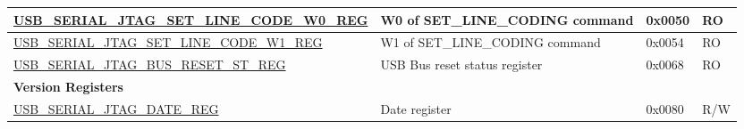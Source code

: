 \begin{longtable}{ | p{7.3cm} | p{5.7cm} | p{1.2cm} | p{1.5cm} | }
\hyperref[regdesc:USBSERIALJTAGSETLINECODEW0REG]{USB\_SERIAL\_JTAG\_SET\_LINE\_CODE\_W0\_REG} & W0 of SET\_LINE\_CODING command & 0x0050 & RO \\ \hline
\hyperref[regdesc:USBSERIALJTAGSETLINECODEW1REG]{USB\_SERIAL\_JTAG\_SET\_LINE\_CODE\_W1\_REG} & W1 of SET\_LINE\_CODING command & 0x0054 & RO \\ \hline
\hyperref[regdesc:USBSERIALJTAGBUSRESETSTREG]{USB\_SERIAL\_JTAG\_BUS\_RESET\_ST\_REG} & USB Bus reset status register & 0x0068 & RO \\ \hline
\multicolumn{4}{|l|}{\textbf{Version Registers}} \\ \hline
\hyperref[regdesc:USBSERIALJTAGDATEREG]{USB\_SERIAL\_JTAG\_DATE\_REG} & Date register & 0x0080 & R/W \\ \hline
\end{longtable}
